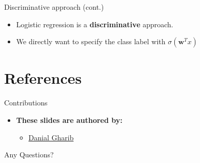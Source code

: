 \documentclass[serif, aspectratio=169]{beamer}
\begin{document}
\begin{frame}{Discriminative approach (cont.)}
    \begin{itemize}
        \item Logistic regression is a \textbf{discriminative} approach.
        \item We directly want to specify the class label with $\sigma (\mathbf{w}^T x)$
    \end{itemize}
\end{frame}

\section{References}

\begin{frame}{Contributions}
\begin{itemize}
\item \textbf{These slides are authored by:}
\begin{itemize}
    \setlength{\itemsep}{10pt} %
    \item \href{https://github.com/Danial-Gharib}{Danial Gharib}
\end{itemize}
\end{itemize}

\end{frame}

\begin{frame}[allowframebreaks]
    
    
    \nocite{*}
\end{frame}

\begin{frame}
    \begin{center}
        {\Huge Any Questions?}
    \end{center}
\end{frame}
\end{document}
